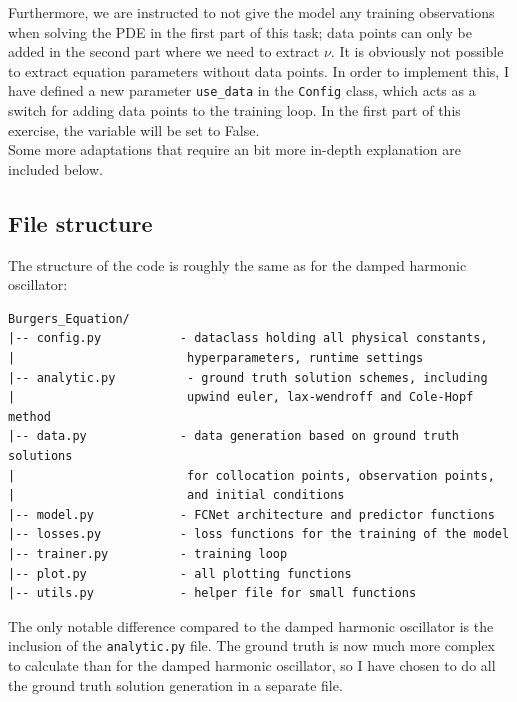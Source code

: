 \documentclass[we,twoside,openright,a4paper,11pt]{uantwerpenbamathesis}
\begin{document}
Furthermore, we are instructed to not give the model any training observations when solving the PDE in the first part of this task; data points can only be added in the second part where we need to extract $\nu$. It is obviously not possible to extract equation parameters without data points. In order to implement this, I have defined a new parameter \verb|use_data| in the \verb|Config| class, which acts as a switch for adding data points to the training loop. In the first part of this exercise, the variable will be set to False.\\

Some more adaptations that require an bit more in-depth explanation are included below.
\subsection{File structure}
The structure of the code is roughly the same as for the damped harmonic oscillator:
\begin{tcolorbox}[title=Burger's equation file structure, colback=black!10!white, colframe=black!40!white, sharp corners]
\begin{verbatim}
Burgers_Equation/
|-- config.py           - dataclass holding all physical constants,
|                        hyperparameters, runtime settings
|-- analytic.py          - ground truth solution schemes, including
|                        upwind euler, lax-wendroff and Cole-Hopf method
|-- data.py             - data generation based on ground truth solutions
|                        for collocation points, observation points,
|                        and initial conditions
|-- model.py            - FCNet architecture and predictor functions
|-- losses.py           - loss functions for the training of the model
|-- trainer.py          - training loop
|-- plot.py             - all plotting functions
|-- utils.py            - helper file for small functions
\end{verbatim}
\end{tcolorbox}
The only notable difference compared to the damped harmonic oscillator is the inclusion of the \verb|analytic.py| file. The ground truth is now much more complex to calculate than for the damped harmonic oscillator, so I have chosen to do all the ground truth solution generation in a separate file. 
\end{document}
